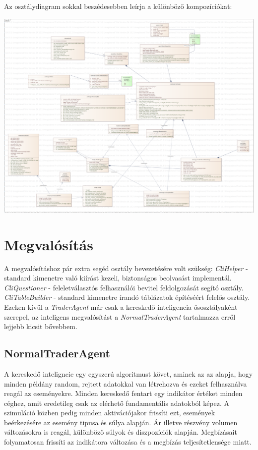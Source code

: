 \documentclass{article}[12pt,a4paper]
\begin{document}
    Az osztálydiagram sokkal beszédesebben leírja a különböző kompozíciókat:
    \begin{center}
        \includegraphics[scale=0.20]{cli}
    \end{center}

    \section{Megvalósítás}
    A megvalósításhoz pár extra segéd osztály bevezetésére volt szükség: \textit{CliHelper} - standard kimenetre való kiírást kezeli, biztonságos beolvasást implementál.
    \textit{CliQuestioner} - feleletválasztós felhasználói bevitel feldolgozását segító osztály.
    \textit{CliTableBuilder} - standard kimenetre írandó táblázatok építéséért felelős osztály.
    Ezeken kívül a \textit{TraderAgent} már csak a kereskedő inteligencia ősosztályaként szerepel, az inteligens megvalósítást a \textit{NormalTraderAgent} tartalmazza erről lejjebb kicsit bővebbem.

    \subsection{NormalTraderAgent}
    A kereskedő inteligncie egy egyszerú algoritmust követ, aminek az az alapja, hogy minden példány random, rejtett adatokkal van létrehozva és ezeket felhasználva reagál az eseményekre.
    Minden kereskedő fentart egy indikátor értéket minden céghez, amit eredetileg csak az elérhető fundamentális adatokból képez.
    A szimuláció közben pedig minden aktivációjakor frissíti ezt, események beérkezésére az esemény tipusa és súlya alapján.
    Ár illetve részvény volumen változásokra is reagál, különböző súlyok és diszpozíciók alapján.
    Megbízásait folyamatosan frissíti az indikátora változása és a megbízás teljesítetlensége miatt.
\end{document}
